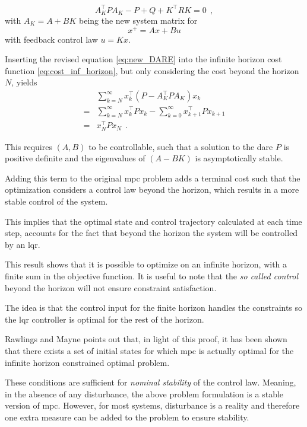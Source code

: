 \begin{equation}\label{eq:new_DARE}
    A_K^\top P A_K - P + Q + K^\top R K = 0\: \: ,
\end{equation}
with $A_K = A + B K $ being the new system matrix for 
\begin{equation}
    x^+ = A x + B u 
\end{equation}
with feedback control law $u = Kx$.

Inserting the revised equation \eqref{eq:new_DARE} into the infinite horizon cost function \eqref{eq:cost_inf_horizon}, but only considering the cost beyond the horizon $N$, yields
\begin{equation}
    \begin{split}
    &\sum_{k=N}^{\infty} x_k^\top (P - A_K^\top P A_K) x_k \\
    = &\sum_{k=N}^{\infty} x_k^\top P x_k - \sum_{k=0}^{\infty} x_{k+1}^\top P x_{k+1} \\
    = & x_N^\top P x_N \: \: .
    \end{split}
\end{equation}

This requires $(A, B)$ to be controllable, such that a solution to the \acrshort{dare} $P$ is positive definite and the eigenvalues of $(A-BK)$ is asymptotically stable.

Adding this term to the original \acrshort{mpc} problem adds a terminal cost such that the optimization considers a control law beyond the horizon, which results in a more stable control of the system.

This implies that the optimal state and control trajectory calculated at each time step, accounts for the fact that beyond the horizon the system will be controlled by an \acrshort{lqr}.

This result shows that it is possible to optimize on an infinite horizon, with a finite sum in the objective function. It is useful to note that the \textit{so called control} beyond the horizon will not ensure constraint satisfaction.

The idea is that the control input for the finite horizon handles the constraints so the \acrshort{lqr} controller is optimal for the rest of the horizon. \cite{optreg}
 
Rawlings and Mayne points out that, in light of this proof, it has been shown that there exists a set of initial states for which \acrshort{mpc} is actually optimal for the infinite horizon constrained optimal problem. 
 
These conditions are sufficient for \textit{nominal stability} of the control law. Meaning, in the absence of any disturbance, the above problem formulation is a stable version of \acrshort{mpc}. However, for most systems, disturbance is a reality and therefore one extra measure can be added to the problem to ensure stability. 

